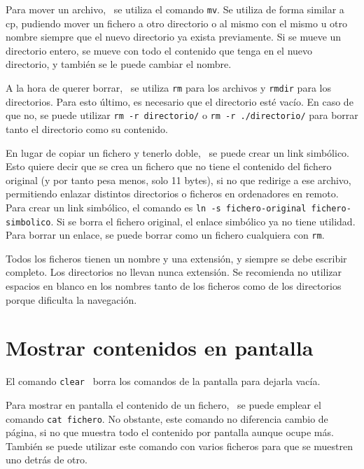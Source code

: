 \documentclass{config/apuntes}
\begin{document}
Para mover un archivo, \marginpar[\footnotesize mv] \ se utiliza el comando \texttt{mv}. Se utiliza de forma similar a cp, pudiendo mover un fichero a otro directorio o al mismo con el mismo u otro nombre siempre que el nuevo directorio ya exista previamente. Si se mueve un directorio entero, se mueve con todo el contenido que tenga en el nuevo directorio, y también se le puede cambiar el nombre. 

A la hora de querer borrar,  \ se utiliza \texttt{rm} para los archivos y \texttt{rmdir} para los directorios. Para esto último, es necesario que el directorio esté vacío. En caso de que no, se puede utilizar \texttt{rm -r directorio/} o \texttt{rm -r ./directorio/} para borrar tanto el directorio como su contenido.

En lugar de copiar un fichero y tenerlo doble, \marginpar[\footnotesize ln] \ se puede crear un link simbólico. Esto quiere decir que se crea un fichero que no tiene el contenido del fichero original (y por tanto pesa menos, solo 11 bytes), si no que redirige a ese archivo, permitiendo enlazar distintos directorios o ficheros en ordenadores en remoto. Para crear un link simbólico, el comando es \texttt{ln -s fichero-original fichero-simbolico}. Si se borra el fichero original, el enlace simbólico ya no tiene utilidad. Para borrar un enlace, se puede borrar como un fichero cualquiera con \texttt{rm}.

\begin{table}[htbp]
\begin{mdframed}[backgroundcolor=black!10]
    \centering
    Todos los ficheros tienen un nombre y una extensión, y siempre se debe escribir completo. Los directorios no llevan nunca extensión. Se recomienda no utilizar espacios en blanco en los nombres tanto de los ficheros como de los directorios porque dificulta la navegación.
    \end{mdframed}
\end{table}

\section{Mostrar contenidos en pantalla}
El comando \texttt{clear}  \ borra los comandos de la pantalla para dejarla vacía.

Para mostrar en pantalla el contenido de un fichero,  \ se puede emplear el comando \texttt{cat fichero}. No obstante, este comando no diferencia cambio de página, si no que muestra todo el contenido por pantalla aunque ocupe más. También se puede utilizar este comando con varios ficheros para que se muestren uno detrás de otro. 
\end{document}
